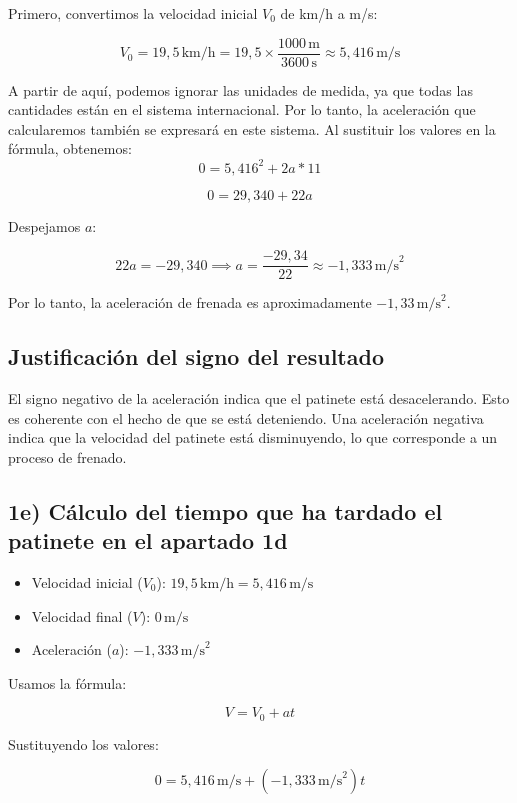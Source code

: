 \documentclass{article}
\begin{document}
Primero, convertimos la velocidad inicial \(V_0\) de km/h a m/s:

\[
V_0 = 19,5 \, \text{km/h} = 19,5 \times \frac{1000 \, \text{m}}{3600 \, \text{s}} \approx 5,416 \, \text{m/s}
\]

A partir de aquí, podemos ignorar las unidades de medida, ya que todas las cantidades están en el sistema internacional. Por lo tanto, la aceleración que calcularemos también se expresará en este sistema. Al sustituir los valores en la fórmula, obtenemos:
\[
0 = 5,416^2 + 2a*11
\]

\[
0 = 29,340 + 22a
\]

Despejamos \(a\):

\[
22a = -29,340 \implies a = \frac{-29,34}{22} \approx \boxed{-1,333 \, \text{m/s}^2}
\]

Por lo tanto, la aceleración de frenada es aproximadamente \(-1,33 \, \text{m/s}^2\).

\subsection*{Justificación del signo del resultado}

El signo negativo de la aceleración indica que el patinete está desacelerando. Esto es coherente con el hecho de que se está deteniendo. Una aceleración negativa indica que la velocidad del patinete está disminuyendo, lo que corresponde a un proceso de frenado.





\subsection*{1e) Cálculo del tiempo que ha tardado el patinete en el apartado 1d}


\begin{itemize}
    \item Velocidad inicial (\( V_0 \)): \( 19,5 \, \text{km/h} = 5,416 \, \text{m/s} \)
    \item Velocidad final (\( V \)): \( 0 \, \text{m/s} \)
    \item Aceleración (\( a \)): \( -1,333 \, \text{m/s}^2 \)
\end{itemize}

Usamos la fórmula:

\[
V = V_0 + at
\]

Sustituyendo los valores:

\[
0 = 5,416 \, \text{m/s} + (-1,333 \, \text{m/s}^2) t 
\]
\end{document}
